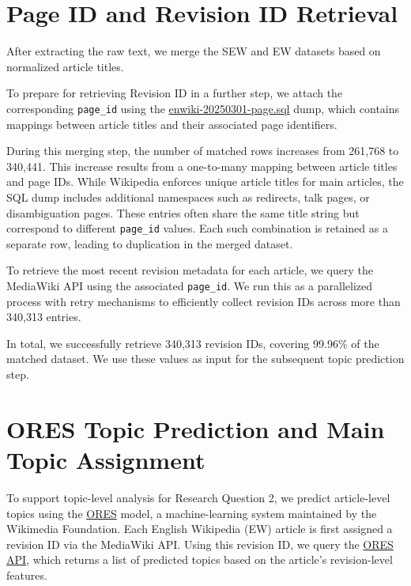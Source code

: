 \documentclass{DESSThesis}
\begin{document}
\section{Page ID and Revision ID Retrieval}

After extracting the raw text, we merge the SEW and EW datasets based on normalized article titles. 

To prepare for retrieving Revision ID in a further step, we attach the corresponding \texttt{page\_id} using the \href{https://dumps.wikimedia.org/enwiki/}{\color{blue} enwiki-20250301-page.sql} dump, which contains mappings between article titles and their associated page identifiers. 

During this merging step, the number of matched rows increases from 261{,}768 to 340{,}441. This increase results from a one-to-many mapping between article titles and page IDs. While Wikipedia enforces unique article titles for main articles, the SQL dump includes additional namespaces such as redirects, talk pages, or disambiguation pages. These entries often share the same title string but correspond to different \texttt{page\_id} values. Each such combination is retained as a separate row, leading to duplication in the merged dataset. 

To retrieve the most recent revision metadata for each article, we query the MediaWiki API using the associated \texttt{page\_id}. We run this as a parallelized process with retry mechanisms to efficiently collect revision IDs across more than 340,313 entries.

In total, we successfully retrieve 340,313 revision IDs, covering 99.96\% of the matched dataset. We use these values as input for the subsequent topic prediction step.

\section{ORES Topic Prediction and Main Topic Assignment}
\label{sec:ores_topic}
To support topic-level analysis for Research Question 2, we predict article-level topics using the \href{https://www.mediawiki.org/wiki/ORES}{\color{blue} ORES} model, a machine-learning system maintained by the Wikimedia Foundation. Each English Wikipedia (EW) article is first assigned a revision ID via the MediaWiki API. Using this revision ID, we query the \href{https://ores.wikimedia.org/docs}{\color{blue} ORES API}, which returns a list of predicted topics based on the article’s revision-level features. 
\end{document}
